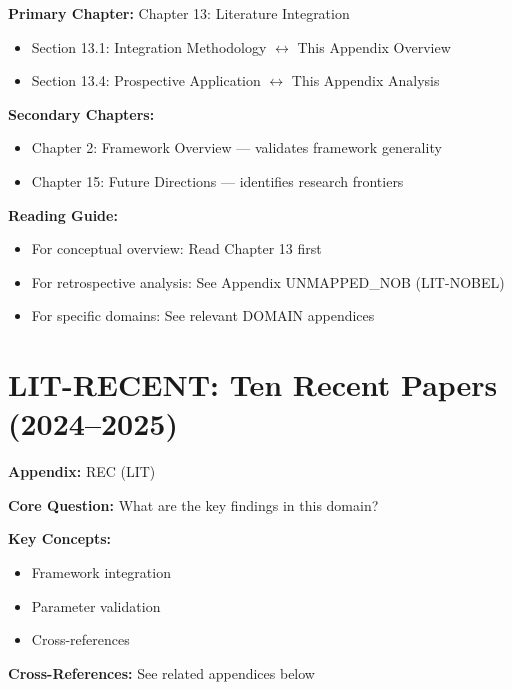 \begin{tcolorbox}[colback=purple!5!white, colframe=purple!75!black,
    title=Chapter Linkage]

\textbf{Primary Chapter:} Chapter 13: Literature Integration
\begin{itemize}[nosep]
\item Section 13.1: Integration Methodology $\leftrightarrow$ This Appendix Overview
\item Section 13.4: Prospective Application $\leftrightarrow$ This Appendix Analysis
\end{itemize}

\textbf{Secondary Chapters:}
\begin{itemize}[nosep]
\item Chapter 2: Framework Overview --- validates framework generality
\item Chapter 15: Future Directions --- identifies research frontiers
\end{itemize}

\textbf{Reading Guide:}
\begin{itemize}[nosep]
\item For conceptual overview: Read Chapter 13 first
\item For retrospective analysis: See Appendix UNMAPPED_NOB (LIT-NOBEL)
\item For specific domains: See relevant DOMAIN appendices
\end{itemize}

\end{tcolorbox}

\chapter{LIT-RECENT: Ten Recent Papers (2024--2025)}
\label{app:recentpapers}

\begin{tcolorbox}[colback=blue!5!white, colframe=blue!75!black,
    title=Quick Reference: Appendix UNMAPPED_REC]

\textbf{Appendix:} REC (LIT)

\textbf{Core Question:} What are the key findings in this domain?

\textbf{Key Concepts:}
\begin{itemize}[nosep]
\item Framework integration
\item Parameter validation
\item Cross-references
\end{itemize}

\textbf{Cross-References:} See related appendices below
\end{tcolorbox}

